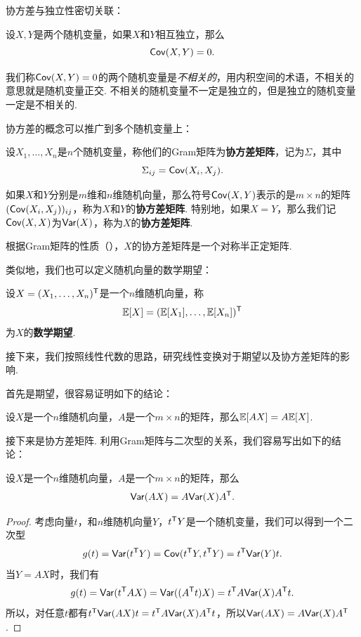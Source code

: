 协方差与独立性密切关联：

\begin{proposition}\label{proposition:independent-covariance}
设$X,Y$是两个随机变量，如果$X$和$Y$相互独立，那么
\[\mathsf{Cov}(X,Y)=0.\]
\end{proposition}

我们称$\mathsf{Cov}(X,Y)=0$的两个随机变量是\textit{不相关的}，用内积空间的术语，不相关的意思就是随机变量正交. 不相关的随机变量不一定是独立的，但是独立的随机变量一定是不相关的. 

协方差的概念可以推广到多个随机变量上：

\begin{definition}[协方差矩阵]
设$X_1,\dots,X_n$是$n$个随机变量，称他们的Gram矩阵为\textbf{协方差矩阵}，记为$\Sigma$，其中
\[\Sigma_{ij}=\mathsf{Cov}(X_i,X_j).\]

如果$X$和$Y$分别是$m$维和$n$维随机向量，那么符号$\mathsf{Cov}(X,Y)$表示的是$m\times n$的矩阵$(\mathsf{Cov}(X_i,X_j))_{ij}$，称为$X$和$Y$的\textbf{协方差矩阵}. 特别地，如果$X=Y$，那么我们记$\mathsf{Cov}(X,X)$为$\mathsf{Var}(X)$，称为$X$的\textbf{协方差矩阵}. 
\end{definition}

根据Gram矩阵的性质（），$X$的协方差矩阵是一个对称半正定矩阵. 

类似地，我们也可以定义随机向量的数学期望：

\begin{definition}[随机向量的数学期望]
设$X=(X_1,\dots,X_n)^{\mathsf{T}}$是一个$n$维随机向量，称
\[\mathbb{E}[X]=(\mathbb{E}[X_1],\dots,\mathbb{E}[X_n])^{\mathsf{T}}\]
为$X$的\textbf{数学期望}. 
\end{definition}

接下来，我们按照线性代数的思路，研究线性变换对于期望以及协方差矩阵的影响. 

首先是期望，很容易证明如下的结论：

\begin{theorem}\label{theorem:expectation-linear}
设$X$是一个$n$维随机向量，$A$是一个$m\times n$的矩阵，那么$\mathbb{E}[AX]=A\mathbb{E}[X]$.
\end{theorem}

接下来是协方差矩阵. 利用Gram矩阵与二次型的关系，我们容易写出如下的结论：

\begin{theorem}\label{theorem:covariance-linear}
设$X$是一个$n$维随机向量，$A$是一个$m\times n$的矩阵，那么
\[\mathsf{Var}(AX)=A\mathsf{Var}(X)A^{\mathsf{T}}.\]
\end{theorem}
\begin{proof}
考虑向量$t$，和$n$维随机向量$Y$，$t^{\mathsf{T}} Y$是一个随机变量，我们可以得到一个二次型
\[g(t)=\mathsf{Var}(t^{\mathsf{T}} Y)=\mathsf{Cov}(t^{\mathsf{T}} Y,t^{\mathsf{T}} Y)=t^{\mathsf{T}}\mathsf{Var}(Y)t.\]
当$Y=AX$时，我们有
\[g(t)=\mathsf{Var}(t^{\mathsf{T}} AX)=\mathsf{Var}((A^{\mathsf{T}} t)X)=t^{\mathsf{T}} A\mathsf{Var}(X)A^{\mathsf{T}} t.\]
所以，对任意$t$都有$t^{\mathsf{T}}\mathsf{Var}(AX)t=t^{\mathsf{T}} A\mathsf{Var}(X)A^{\mathsf{T}} t$，所以$\mathsf{Var}(AX)=A\mathsf{Var}(X)A^{\mathsf{T}}$.
\end{proof}

